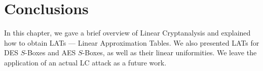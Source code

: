 \documentclass{report}
\begin{document}
\section{Conclusions}
In this chapter, we gave a brief overview of Linear Cryptanalysis and explained how to obtain LATs --- Linear Approximation Tables. We also presented LATs for DES $S$-Boxes and AES $S$-Boxes, as well as their linear uniformities. We leave the application of an actual LC attack as a future work.



\end{document}
